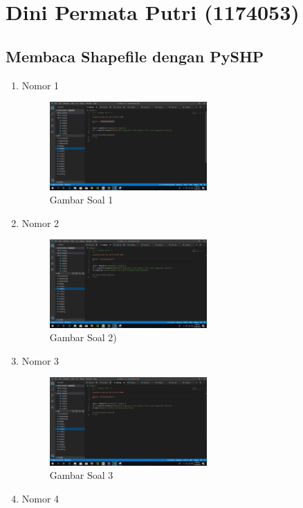 \section{Dini Permata Putri (1174053)}
\subsection{Membaca Shapefile dengan PySHP}
\begin{enumerate}
	\item Nomor 1
	
	\begin{figure}[H]
		\includegraphics[width=6cm]{figures/Tugas3/1174053/soal1.png}
		\centering
		\caption{Gambar Soal 1}
	\end{figure}
	\item Nomor 2
	
	\begin{figure}[H]
		\includegraphics[width=6cm]{figures/Tugas3/1174053/soal2.png}
		\centering
		\caption{Gambar Soal 2)}
	\end{figure}
	\item Nomor 3
	
	\begin{figure}[H]
		\includegraphics[width=6cm]{figures/Tugas3/1174053/soal3.png}
		\centering
		\caption{Gambar Soal 3}
	\end{figure}
	\item Nomor 4
	

\end{enumerate}

